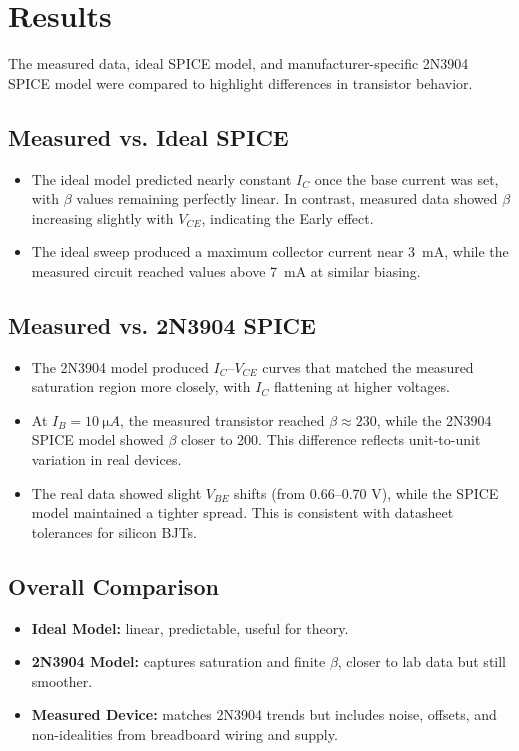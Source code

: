 \documentclass[12pt]{article}
\begin{document}
\section{Results}

The measured data, ideal SPICE model, and manufacturer-specific 2N3904 SPICE
model were compared to highlight differences in transistor behavior.

\subsection*{Measured vs. Ideal SPICE}
\begin{itemize}
  \item The ideal model predicted nearly constant $I_C$ once the base current was set,
        with $\beta$ values remaining perfectly linear. In contrast, measured data
        showed $\beta$ increasing slightly with $V_{CE}$, indicating the Early effect.
  \item The ideal sweep produced a maximum collector current near \SI{3}{mA}, while
        the measured circuit reached values above \SI{7}{mA} at similar biasing.
\end{itemize}

\subsection*{Measured vs. 2N3904 SPICE}
\begin{itemize}
  \item The 2N3904 model produced $I_C$--$V_{CE}$ curves that matched the measured
        saturation region more closely, with $I_C$ flattening at higher voltages.
  \item At $I_B = \SI{10}{\micro A}$, the measured transistor reached
        $\beta \approx 230$, while the 2N3904 SPICE model showed $\beta$ closer
        to 200. This difference reflects unit-to-unit variation in real devices.
  \item The real data showed slight $V_{BE}$ shifts (from 0.66--0.70 V), while
        the SPICE model maintained a tighter spread. This is consistent with
        datasheet tolerances for silicon BJTs.
\end{itemize}

\subsection*{Overall Comparison}
\begin{itemize}
  \item \textbf{Ideal Model:} linear, predictable, useful for theory.
  \item \textbf{2N3904 Model:} captures saturation and finite $\beta$, closer to
        lab data but still smoother.
  \item \textbf{Measured Device:} matches 2N3904 trends but includes noise,
        offsets, and non-idealities from breadboard wiring and supply.
\end{itemize}
\end{document}
